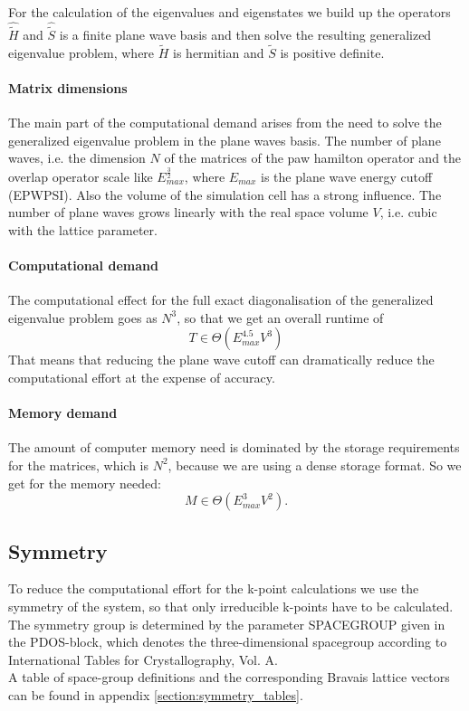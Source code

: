 \documentclass[final,12pt,makeidx,DIV=calc]{article}
\begin{document}
{{{{{{For the calculation of the eigenvalues and eigenstates we build up the
operators $\hat{\tilde H}$ and $\hat{\tilde S}$ is a finite plane wave
basis and then solve the resulting generalized eigenvalue problem,
where $\tilde H$ is hermitian and $\tilde S$ is positive definite.

\paragraph{Matrix dimensions}
The main part of the computational demand arises from the need to solve the
generalized eigenvalue problem in the plane waves basis. The number of plane
waves, i.e. the dimension $N$ of the matrices of the paw hamilton operator and the
overlap operator scale like $E_{max}^{\frac{3}{2}}$, where $E_{max}$ is the
plane wave energy cutoff (EPWPSI). Also the volume of the simulation cell has a
strong influence. The number of plane waves grows linearly with the real space
volume $V$, i.e. cubic with the lattice parameter.
\paragraph{Computational demand}
The computational effect for the full exact diagonalisation of the generalized
eigenvalue problem goes as $N^3$, so that we get an overall runtime of
\begin{equation}
T \in \Theta(E_{max}^{4.5}V^3)
\end{equation}
That means that reducing the plane wave cutoff can dramatically reduce the
computational effort at the expense of accuracy.

\paragraph{Memory demand}
The amount of computer memory need is dominated by the storage requirements for
the matrices, which is $N^2$, because we are using a dense storage format.  So
we get for the memory needed:
\begin{equation}
  M\in \Theta(E_{max}^{3}V^2).
\end{equation}

\subsection{Symmetry}
To reduce the computational effort for the k-point calculations we use the
symmetry of the system, so that only irreducible k-points have to be calculated.
The symmetry group is determined by the parameter SPACEGROUP given in the
PDOS-block, which denotes the three-dimensional spacegroup according to
International Tables for Crystallography, Vol. A. \\
A table of space-group definitions and the corresponding Bravais lattice vectors
can be found in appendix \ref{section:symmetry_tables}.



}}}}}}
\end{document}
